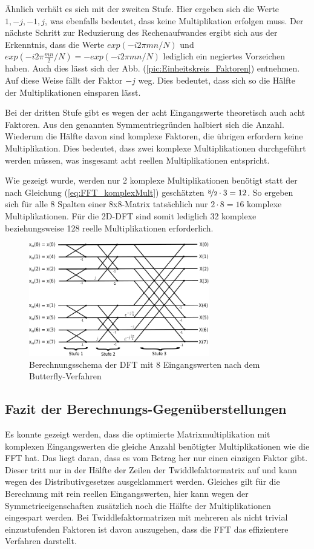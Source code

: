 Ähnlich verhält es sich mit der zweiten Stufe.
Hier ergeben sich die Werte $1, -j, -1, j$, was ebenfalls bedeutet, dass keine Multiplikation erfolgen muss. Der nächste Schritt zur Reduzierung des Rechenaufwandes ergibt sich
aus der Erkenntnis, dass die Werte $exp(-i 2 \pi m n/N)$ und $exp(-i 2 \pi \frac{m n}{2}/N) = -exp(-i 2 \pi m n/N)$ lediglich ein negiertes Vorzeichen haben. Auch dies lässt sich der 
Abb. (\ref{pic:Einheitskreis_Faktoren}) entnehmen. Auf diese Weise fällt der Faktor $-j$ weg. Dies bedeutet, dass sich so die Hälfte der Multiplikationen einsparen lässt.

Bei der dritten Stufe gibt es wegen der acht Eingangswerte theoretisch auch acht Faktoren. Aus den genannten Symmentriegründen halbiert sich die Anzahl. Wiederum die Hälfte davon 
sind komplexe Faktoren, die übrigen erfordern keine Multiplikation. Dies bedeutet, dass zwei komplexe Multiplikationen durchgeführt werden müssen, was insgesamt acht reellen 
Multiplikationen entspricht. 

Wie gezeigt wurde, werden nur 2 komplexe Multiplikationen benötigt statt der nach Gleichung (\ref{eq:FFT_komplexMult}) geschätzten $\nicefrac{8}{2}\cdot 3 = 12$.
So ergeben sich für alle 8 Spalten einer 8x8-Matrix tatsächlich nur $2\cdot8=16$ komplexe Multiplikationen. 
Für die 2D-DFT sind somit lediglich 32 komplexe beziehungsweise 128 reelle Multiplikationen erforderlich.



\begin{figure}[htbp]
 \centering
 \includegraphics[width=0.7\textwidth]{img/Butterfly.png}
 \caption{Berechnungsschema der DFT mit 8 Eingangswerten nach dem Butterfly-Verfahren}
 \label{pic:Butterfly}
\end{figure}


\subsection{Fazit der Berechnungs-Gegenüberstellungen}
Es konnte gezeigt werden, dass die optimierte Matrixmultiplikation mit komplexen Eingangswerten die gleiche Anzahl benötigter Multiplikationen wie die FFT hat.
Das liegt daran, dass es vom Betrag her nur einen einzigen Faktor gibt. Dieser tritt nur in der Hälfte der Zeilen der Twiddlefaktormatrix auf und kann wegen des Distributivgesetzes
ausgeklammert werden. Gleiches gilt für die Berechnung mit rein reellen Eingangswerten, hier kann wegen der Symmetrieeigenschaften zusätzlich noch die Hälfte der
Multiplikationen eingespart werden.
Bei Twiddlefaktormatrizen mit mehreren als nicht trivial einzustufenden Faktoren ist davon auszugehen, dass die FFT das effizientere Verfahren darstellt. 

